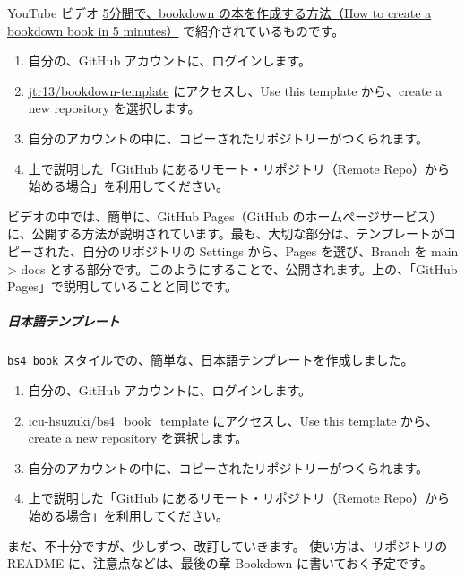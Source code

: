 \documentclass[
]{bxjsbook}
\providecommand{\tightlist}{%
  \setlength{\itemsep}{0pt}\setlength{\parskip}{0pt}}
\theoremstyle{definition}
\theoremstyle{definition}
\theoremstyle{definition}
\theoremstyle{definition}
\theoremstyle{remark}
\begin{document}
YouTube ビデオ \href{https://www.youtube.com/watch?v=m5D-yoH416Y}{5分間で、bookdown の本を作成する方法（How to create a bookdown book in 5 minutes）} で紹介されているものです。

\begin{enumerate}
\def\labelenumi{\arabic{enumi}.}
\tightlist
\item
  自分の、GitHub アカウントに、ログインします。
\item
  \href{https://github.com/jtr13/bookdown-template}{jtr13/bookdown-template} にアクセスし、Use this template から、create a new repository を選択します。
\item
  自分のアカウントの中に、コピーされたリポジトリーがつくられます。
\item
  上で説明した「GitHub にあるリモート・リポジトリ（Remote Repo）から始める場合」を利用してください。
\end{enumerate}

ビデオの中では、簡単に、GitHub Pages（GitHub のホームページサービス）に、公開する方法が説明されています。最も、大切な部分は、テンプレートがコピーされた、自分のリポジトリの Settings から、Pages を選び、Branch を main \textgreater{} docs とする部分です。このようにすることで、公開されます。上の、「GitHub Pages」で説明していることと同じです。

\hypertarget{ux65e5ux672cux8a9eux30c6ux30f3ux30d7ux30ecux30fcux30c8}{%
\subparagraph{日本語テンプレート}\label{ux65e5ux672cux8a9eux30c6ux30f3ux30d7ux30ecux30fcux30c8}}

\texttt{bs4\_book} スタイルでの、簡単な、日本語テンプレートを作成しました。

\begin{enumerate}
\def\labelenumi{\arabic{enumi}.}
\tightlist
\item
  自分の、GitHub アカウントに、ログインします。
\item
  \href{https://github.com/icu-hsuzuki/bs4_book_template}{icu-hsuzuki/bs4\_book\_template} にアクセスし、Use this template から、create a new repository を選択します。
\item
  自分のアカウントの中に、コピーされたリポジトリーがつくられます。
\item
  上で説明した「GitHub にあるリモート・リポジトリ（Remote Repo）から始める場合」を利用してください。
\end{enumerate}

まだ、不十分ですが、少しずつ、改訂していきます。
使い方は、リポジトリの README に、注意点などは、最後の章 Bookdown に書いておく予定です。
\end{document}
